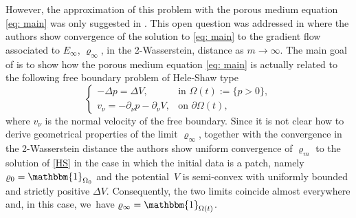 \documentclass[10pt]{amsart}
\let\mathds\mathbbm
\theoremstyle{plain}
\theoremstyle{remark}
\begin{document}
However, the approximation of this problem with the porous medium equation \eqref{eq: main} was only suggested in \cite{MRSV2011, MRS2010}. This open question was addressed in \cite{AKY14} where the authors show convergence of the solution to \eqref{eq: main} to the gradient flow associated to $E_\infty$, $\varrho_\infty$, in the 2-Wasserstein, distance as $m\to\infty$. The main goal of \cite{AKY14} is to show how the porous medium equation \eqref{eq: main} is actually related to the following free boundary problem of Hele-Shaw type
\begin{equation}\label{HS}
\begin{cases}
-\Delta p = \Delta V, &\text{in } \Omega(t):=\{p>0\},\\
v_\nu= -\partial_\nu p -\partial_\nu V, &\text{on } \partial\Omega(t),
\end{cases}
\end{equation}
where $v_\nu$ is the normal velocity of the free boundary. Since it is not clear how to derive geometrical properties of the limit $\varrho_\infty$, together with the convergence in the 2-Wasserstein distance the authors show uniform convergence of $\varrho_m$ to the solution of \eqref{HS} in the case in which the initial data is a patch, namely $\varrho_0=\mathds{1}_{\Omega_0}$ and the potential~$V$ is semi-convex with uniformly bounded and strictly positive $\Delta V$. Consequently, the two limits coincide almost everywhere and, in this case, we~have $\varrho_\infty=\mathds{1}_{\Omega(t)}$.
\end{document}
